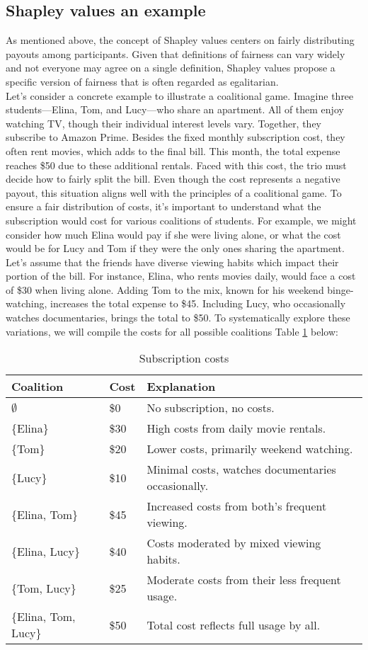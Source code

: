\documentclass[12pt]{article}
\begin{document}
 \subsection{Shapley values an example}
As mentioned above, the concept of Shapley values centers on fairly distributing payouts among participants. Given that definitions of fairness can vary widely and not everyone may agree on a single definition, Shapley values propose a specific version of fairness that is often regarded as egalitarian. \\
Let's consider a concrete example to illustrate a coalitional game.
Imagine three students—Elina, Tom, and Lucy—who share an apartment. All of them enjoy watching TV, though their individual interest levels vary. Together, they subscribe to Amazon Prime. 
Besides the fixed monthly subscription cost, they often rent movies, which adds to the final bill. This month, the total expense reaches \$50 due to these additional rentals. Faced with this cost, the trio must decide how to fairly split the bill. Even though the cost represents a negative payout, this situation aligns well with the principles of a coalitional game. To ensure a fair distribution of costs, it's important to understand what the subscription would cost for various coalitions of students. For example, we might consider how much Elina would pay if she were living alone, or what the cost would be for Lucy and Tom if they were the only ones sharing the apartment.
Let's assume that the friends have diverse viewing habits which impact their portion of the bill. For instance, Elina, who rents movies daily, would face a cost of \$30 when living alone. Adding Tom to the mix, known for his weekend binge-watching, increases the total expense to \$45. Including Lucy, who occasionally watches documentaries, brings the total to \$50. To systematically explore these variations, we will compile the costs for all possible coalitions Table \ref{tab:subscription_costs} below:
\begin{table}[htbp]
	\centering
	\caption{Subscription costs}
	\begin{tabular}{lll}
		\toprule
		Coalition & Cost & Explanation \\
		\midrule
		$\emptyset$ & \$0 & No subscription, no costs. \\
		\{Elina\} & \$30 & High costs from daily movie rentals. \\
		\{Tom\} & \$20 & Lower costs, primarily weekend watching. \\
		\{Lucy\} & \$10 & Minimal costs, watches documentaries occasionally. \\
		\{Elina, Tom\} & \$45 & Increased costs from both's frequent viewing. \\
		\{Elina, Lucy\} & \$40 & Costs moderated by mixed viewing habits. \\
		\{Tom, Lucy\} & \$25 & Moderate costs from their less frequent usage. \\
		\{Elina, Tom, Lucy\} & \$50 & Total cost reflects full usage by all. \\
		\bottomrule
	\end{tabular}%
	\label{tab:subscription_costs}%
\end{table}%
\end{document}
